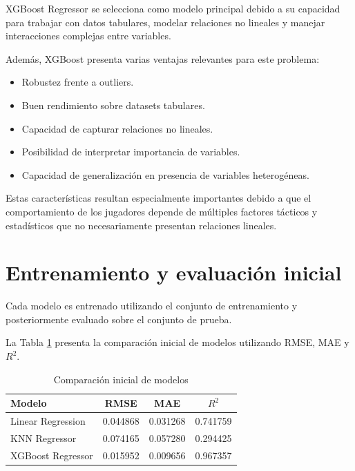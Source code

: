 \documentclass{ULBreport} %
\begin{document}
XGBoost Regressor se selecciona como modelo principal debido a su capacidad para trabajar con datos tabulares, modelar relaciones no lineales y manejar interacciones complejas entre variables.

Además, XGBoost presenta varias ventajas relevantes para este problema:

\begin{itemize}
    \item Robustez frente a outliers.
    \item Buen rendimiento sobre datasets tabulares.
    \item Capacidad de capturar relaciones no lineales.
    \item Posibilidad de interpretar importancia de variables.
    \item Capacidad de generalización en presencia de variables heterogéneas.
\end{itemize}

Estas características resultan especialmente importantes debido a que el comportamiento de los jugadores depende de múltiples factores tácticos y estadísticos que no necesariamente presentan relaciones lineales.

\section{Entrenamiento y evaluación inicial}

Cada modelo es entrenado utilizando el conjunto de entrenamiento y posteriormente evaluado sobre el conjunto de prueba.

La Tabla \ref{tab:model_comparison} presenta la comparación inicial de modelos utilizando RMSE, MAE y $R^2$.

\begin{table}[H]
    \centering
    \caption{Comparación inicial de modelos}
    \label{tab:model_comparison}
    \begin{tabular}{|l|c|c|c|}
        \hline
        \textbf{Modelo} & \textbf{RMSE} & \textbf{MAE} & \textbf{$R^2$} \\ \hline
        Linear Regression & 0.044868 & 0.031268 & 0.741759 \\ \hline
        KNN Regressor & 0.074165 & 0.057280 & 0.294425 \\ \hline
        XGBoost Regressor & 0.015952 & 0.009656 & 0.967357 \\ \hline
    \end{tabular}
\end{table}
\end{document}
